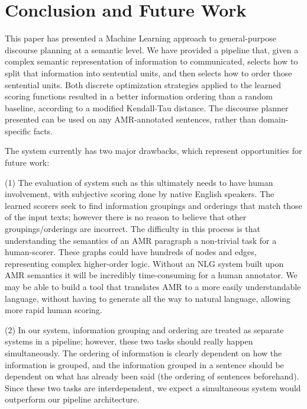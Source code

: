 \documentclass[12pt]{article}
\begin{document}
\section{Conclusion and Future Work}
This paper has presented a Machine Learning approach to general-purpose discourse planning at a semantic level. We have provided a pipeline that, given a complex semantic representation of information to communicated, selects how to split that information into sentential units, and then selects how to order those sentential units. Both discrete optimization strategies applied to the learned scoring functions resulted in a better information ordering than a random baseline, according to a modified Kendall-Tau distance. The discourse planner presented can be used on any AMR-annotated sentences, rather than domain-specific facts. 

The system currently has two major drawbacks, which represent opportunities for future work:

(1) The evaluation of system such as this ultimately needs to have human involvement, with subjective scoring done by native English speakers. The learned scorers seek to find information groupings and orderings that match those of the input texts; however there is no reason to believe that other groupings/orderings are incorrect. The difficulty in this process is that understanding the semantics of an AMR paragraph a non-trivial task for a human-scorer. These graphs could have hundreds of nodes and edges, representing complex higher-order logic. Without an NLG system built upon AMR semantics it will be incredibly time-consuming for a human annotator. We may be able to build a tool that translates AMR to a more easily understandable language, without having to generate all the way to natural language, allowing more rapid human scoring. 

(2) In our system, information grouping and ordering are treated as separate systems in a pipeline; however, these two tasks should really happen simultaneously. The ordering of information is clearly dependent on how the information is grouped, and the information grouped in a sentence should be dependent on what has already been said (the ordering of sentences beforehand). Since these two tasks are interdependent, we expect a simultaneous system would outperform our pipeline architecture.

\pagebreak


\end{document}
